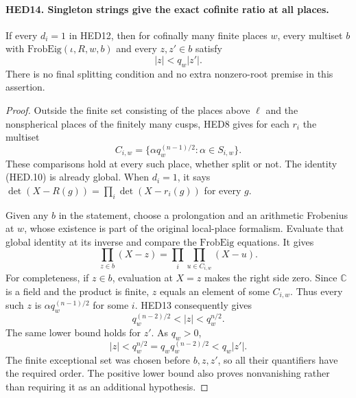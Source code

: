 \documentclass[11pt,a4paper]{article}
\numberwithin{equation}{section}
\theoremstyle{remark}\newtheorem{remark}[theorem]{Remark}
\begin{document}
\paragraph{HED14. Singleton strings give the exact cofinite ratio at all places.}
\label{claim:HED14}
If every \(d_i=1\) in HED12, then for cofinally many finite places
\(w\), every multiset \(b\) with
\(\mathrm{FrobEig}(\iota,R,w,b)\) and every \(z,z'\in b\) satisfy
\[
                             |z|<q_w|z'|.
 \tag{HED.12}
\]
There is no final splitting condition and no extra nonzero-root
premise in this assertion.
\begin{proof}
Outside the finite set consisting of the places above \(\ell\)
and the nonspherical places of the finitely many cusps, HED8 gives
for each \(r_i\) the multiset
\[
                  C_{i,w}=\{\alpha q_w^{(n-1)/2}:
                                              \alpha\in S_{i,w}\}.
\]
These comparisons hold at every such place, whether split or not.
The identity (HED.10) is already global.  When \(d_i=1\), it says
\(\det(X-R(g))=\prod_i\det(X-r_i(g))\) for every \(g\).

Given any \(b\) in the statement, choose a prolongation and an
arithmetic Frobenius at \(w\), whose existence is part of the
original local-place formalism.  Evaluate that global identity at
its inverse and compare the \(\mathrm{FrobEig}\) equations.  It gives
\[
                  \prod_{z\in b}(X-z)
                         =\prod_i\prod_{u\in C_{i,w}}(X-u).
\]
For completeness, if \(z\in b\), evaluation at \(X=z\) makes the
right side zero.  Since \(\mathbb C\) is a field and the product
is finite, \(z\) equals an element of some \(C_{i,w}\).  Thus
every such \(z\) is \(\alpha q_w^{(n-1)/2}\) for some \(i\).
HED13 consequently gives
\[
                    q_w^{(n-2)/2}<|z|<q_w^{n/2}.
 \tag{HED.13}
\]
The same lower bound holds for \(z'\).  As \(q_w>0\),
\[
             |z|<q_w^{n/2}
                    =q_w q_w^{(n-2)/2}<q_w|z'|.
\]
The finite exceptional set was chosen before \(b,z,z'\), so all
their quantifiers have the required order.  The positive lower
bound also proves nonvanishing rather than requiring it as an
additional hypothesis.
\end{proof}

\end{document}
